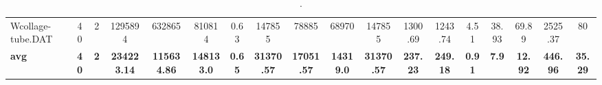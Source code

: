 \begin{sidewaystable}[h]
{\begin{tabular}{lccccccccccccccccc}
Wcollage-tube.DAT & 40 & 2 & 1295894 & 632865 & 810814 & 0.63 & 147855 & 78885 & 68970 & 147855 & 1300.69 & 1243.74 & 4.51 & 38.93 & 69.89 & 2525.37 & 80\\
\cline{1-18} \textbf{avg} & \textbf{40} & \textbf{2} & \textbf{234223.14} & \textbf{115634.86} & \textbf{148133.0} & \textbf{0.65} & \textbf{31370.57} & \textbf{17051.57} & \textbf{14319.0} & \textbf{31370.57} & \textbf{237.23} & \textbf{249.18} & \textbf{0.91} & \textbf{7.9} & \textbf{12.92} & \textbf{446.96} & \textbf{35.29} \\ \cline{1-18}
\bottomrule
\end{tabular}%
}%
\caption{.}
\label{tab:table_bc_EPB}
\end{sidewaystable}

